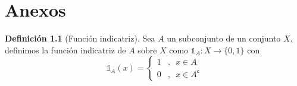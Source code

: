 \documentclass[11pt,a4paper]{book}
\theoremstyle{definition}%
\newtheorem{definicion}[teorema]{Definici\'on}
\newcommand{\setcomplement}{\mathsf{c}}
\begin{document}
    \chapter{Anexos}
        \begin{definicion}[Función indicatriz]
            Sea $A$ un subconjunto de un conjunto $X$, definimos la función indicatriz de $A$ sobre $X$ como $\mathds{1}_A:X\longrightarrow\{0,1\}$ con
            \begin{equation*}
                \mathds{1}_A (x)=\left\{\begin{array}{cl}
                    1&,\enspace x\in A  \\
                    0&,\enspace x \in A^\setcomplement
                \end{array}\right.
            \end{equation*}
        \end{definicion}
\end{document}
